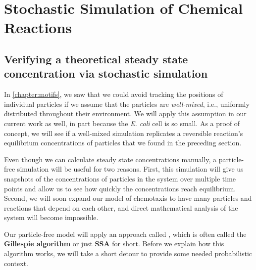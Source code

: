 \FloatBarrier
{}

\section{Stochastic Simulation of Chemical Reactions}
\label{sec:stochastic_simulation_of_chemical_reactions}
\subsection{Verifying a theoretical steady state concentration via stochastic simulation}

In \autoref{chapter:motifs}, we saw that we could avoid tracking the positions of individual particles if we assume that the particles are \textit{well-mixed}, i.e., uniformly distributed throughout their environment. We will apply this assumption in our current work as well, in part because the \textit{E. coli} cell is so small. As a proof of concept, we will see if a well-mixed simulation replicates a reversible reaction's equilibrium concentrations of particles that we found in the preceding section.

Even though we can calculate steady state concentrations manually, a particle-free simulation will be useful for two reasons. First, this simulation will give us snapshots of the concentrations of particles in the system over multiple time points and allow us to see how quickly the concentrations reach equilibrium. Second, we will soon expand our model of chemotaxis to have many particles and reactions that depend on each other, and direct mathematical analysis of the system will become impossible.\\

\begin{note}\end{note}

Our particle-free model will apply an approach called , which is often called the \textbf{Gillespie algorithm} or just \textbf{SSA} for short. Before we explain how this algorithm works, we will take a short detour to provide some needed probabilistic context.

